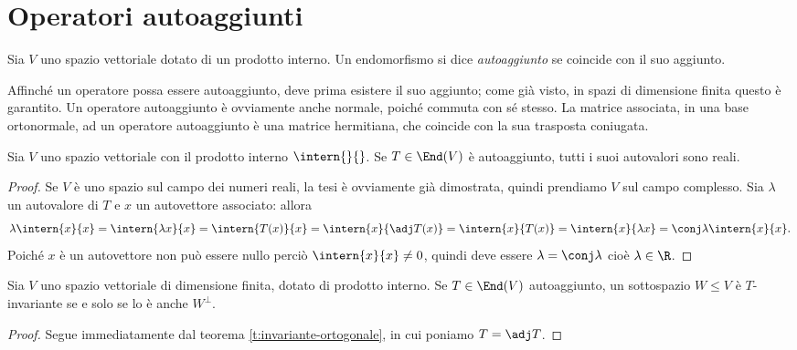 \section{Operatori autoaggiunti} \label{sec:operatori-autoaggiunti}
\begin{definizione} \label{d:operatore-autoaggiunto}
	Sia $V$ uno spazio vettoriale dotato di un prodotto interno.
	Un endomorfismo si dice \emph{autoaggiunto} se coincide con il suo aggiunto.
\end{definizione}
Affinch\'e un operatore possa essere autoaggiunto, deve prima esistere il suo aggiunto; come già visto, in spazi di dimensione finita questo è garantito.
Un operatore autoaggiunto è ovviamente anche normale, poich\'e commuta con s\'e stesso.
La matrice associata, in una base ortonormale, ad un operatore autoaggiunto è una matrice hermitiana, che coincide con la sua trasposta coniugata.
\begin{teorema}	\label{t:autovalori-operatore-autoaggiunto}
	Sia $V$ uno spazio vettoriale con il prodotto interno $\intern{}{}$.
	Se $T\in\End(V)$ è autoaggiunto, tutti i suoi autovalori sono reali.
\end{teorema}
\begin{proof}
	Se $V$ è uno spazio sul campo dei numeri reali, la tesi è ovviamente già dimostrata, quindi prendiamo $V$ sul campo complesso.
	Sia $\lambda$ un autovalore di $T$ e $  x$ un autovettore associato: allora
	\begin{equation}
		\lambda\intern{  x}{  x}=\intern{\lambda  x}{  x}=\intern{T(  x)}{  x}=\intern{  x}{\adj T(  x)}=\intern{  x}{T(  x)}=\intern{  x}{\lambda  x}=\conj\lambda\intern{  x}{  x}.
	\end{equation}
	Poich\'e $  x$ è un autovettore non può essere nullo perciò $\intern{  x}{  x}\neq 0$, quindi deve essere $\lambda=\conj\lambda$ cioè $\lambda\in\R$.
\end{proof}

\begin{teorema}
	Sia $V$ uno spazio vettoriale di dimensione finita, dotato di prodotto interno.
	Se $T\in\End(V)$ autoaggiunto, un sottospazio $W\leq V$ è $T$-invariante se e solo se lo è anche $W^\perp$.
\end{teorema}
\begin{proof}
	Segue immediatamente dal teorema \ref{t:invariante-ortogonale}, in cui poniamo $T=\adj T$.
\end{proof}


